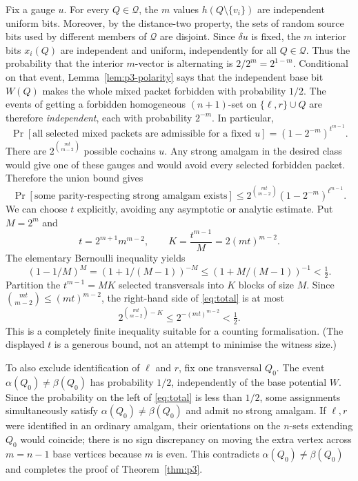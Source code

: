 \documentclass[11pt,a4paper]{article}
\theoremstyle{remark}
\begin{document}
Fix a gauge $u$. For every $Q\in\mathcal Q$, the $m$ values
$h(Q\setminus\{v_i\})$ are independent uniform bits. Moreover, by
the distance-two property, the sets of random source bits used by
different members of $\mathcal Q$ are disjoint. Since $\delta u$
is fixed, the $m$ interior bits $x_i(Q)$ are independent and uniform,
independently for all $Q\in\mathcal Q$.
Thus the probability that the interior $m$-vector is alternating is
$2/2^m=2^{1-m}$. Conditional on that event, Lemma~\ref{lem:p3-polarity}
says that the independent base bit $W(Q)$ makes the whole mixed packet
forbidden with probability $1/2$. The events of getting a forbidden
homogeneous $(n+1)$-set on $\{\ell,r\}\cup Q$ are therefore
\emph{independent}, each with probability $2^{-m}$. In particular,
\begin{equation}\label{eq:fixed}
 \Pr[\text{all selected mixed packets are admissible for a fixed }u]
 = (1-2^{-m})^{t^{m-1}}.
\end{equation}
There are $2^{\binom{mt}{m-2}}$ possible cochains $u$. Any strong
amalgam in the desired class would give one of these gauges and would
avoid every selected forbidden packet. Therefore the union bound gives
\begin{equation}\label{eq:total}
 \Pr[\text{some parity-respecting strong amalgam exists}]
 \le 2^{\binom{mt}{m-2}}(1-2^{-m})^{t^{m-1}}.
\end{equation}
We can choose $t$ explicitly, avoiding any asymptotic or
analytic estimate. Put $M=2^m$ and
\[
 t=2^{m+1}m^{m-2},\qquad
 K=\frac{t^{m-1}}M=2(mt)^{m-2}.
\]
The elementary Bernoulli inequality yields
\[
 (1-1/M)^M=(1+1/(M-1))^{-M}
 \le (1+M/(M-1))^{-1}<\tfrac12.
\]
Partition the $t^{m-1}=MK$ selected transversals into $K$
blocks of size $M$. Since
$\binom{mt}{m-2}\le(mt)^{m-2}$, the right-hand side of
\eqref{eq:total} is at most
\[
 2^{\binom{mt}{m-2}-K}
 \le2^{-(mt)^{m-2}}<\tfrac12.
\]
This is a completely finite inequality suitable for a counting
formalisation. (The displayed $t$ is a generous bound, not an
attempt to minimise the witness size.)

To also exclude identification of $\ell$ and $r$, fix one transversal
$Q_0$. The event $\alpha(Q_0)\ne\beta(Q_0)$ has probability
$1/2$, independently of the base potential $W$. Since the
probability on the left of \eqref{eq:total} is less than $1/2$,
some assignments simultaneously satisfy $\alpha(Q_0)\ne\beta(Q_0)$
and admit no strong amalgam. If $\ell,r$ were identified in an
ordinary amalgam, their orientations on the $n$-sets extending
$Q_0$ would coincide; there is no sign discrepancy on moving the
extra vertex across $m=n-1$ base vertices because $m$ is even.
This contradicts $\alpha(Q_0)\ne\beta(Q_0)$ and completes the
proof of Theorem~\ref{thm:p3}.
\end{document}
